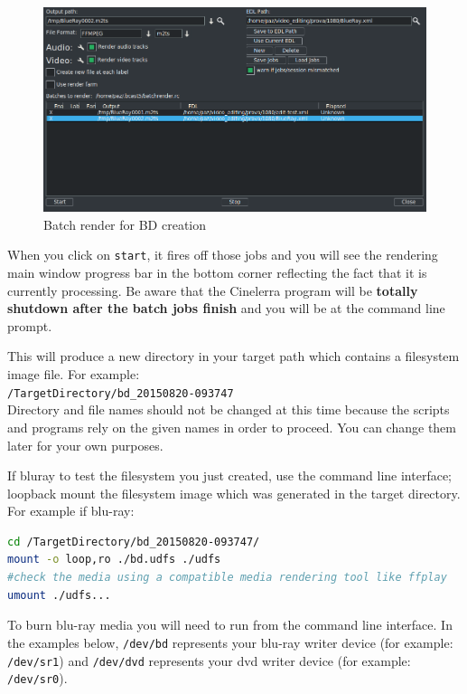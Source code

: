 \begin{figure}[htpb]
    \centering
    \includegraphics[width=0.8\linewidth]{images/dvd-batch02.png}
    \caption{Batch render for BD creation}
    \label{fig:dvd-batch02}
\end{figure}

When you click on \texttt{start}, it fires off those jobs and you will see the rendering main window progress bar in the bottom corner reflecting the fact that it is currently processing.  Be aware that the Cinelerra program will be \textbf{totally shutdown after the batch jobs finish} and you will be at the command line prompt.

This will produce a new directory in your target path which contains a filesystem image file.
For example: \\
\texttt{/TargetDirectory/bd\_20150820-093747} \\
Directory and file names should not be changed at this time because the scripts and programs rely on the given names in order to proceed.  You can change them later for your own purposes.

If bluray to test the filesystem you just created, use the command line interface; loopback mount the filesystem image which was generated in the target directory.  For example if blu-ray:

\begin{lstlisting}[language=bash,numbers=none]
cd /TargetDirectory/bd_20150820-093747/
mount -o loop,ro ./bd.udfs ./udfs
#check the media using a compatible media rendering tool like ffplay
umount ./udfs...
\end{lstlisting}

To burn blu-ray media you will need to run from the command line interface.  In the examples below, \texttt{/dev/bd} represents your blu-ray writer device (for example: \texttt{/dev/sr1}) and \texttt{/dev/dvd} represents your dvd writer device (for example: \texttt{/dev/sr0}).

